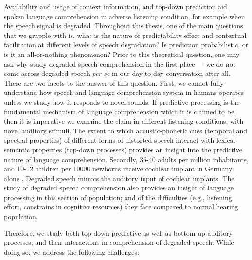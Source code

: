\documentclass[a4paper, nobind]{templates/ociamthesis}
\begin{document}
Availability and usage of context information, and top-down prediction aid spoken language comprehension in adverse listening condition, for example when the speech signal is degraded.
Throughout this thesis, one of the main questions that we grapple with is, what is the nature of predictability effect and contextual facilitation at different levels of speech degradation?
Is prediction probabilistic, or is it an all-or-nothing phenomenon?
Prior to this theoretical question, one may ask why study degraded speech comprehension in the first place --- we do not come across degraded speech \emph{per se} in our day-to-day conversation after all.
There are two facets to the answer of this question.
First, we cannot fully understand how speech and language comprehension system in humans operates unless we study how it responds to novel sounds.
If predictive processing is the fundamental mechanism of language comprehension which it is claimed to be, then it is imperative we examine the claim in different listening conditions, with novel auditory stimuli.
The extent to which acoustic-phonetic cues (temporal and spectral properties) of different forms of distorted speech interact with lexical-semantic properties (top-down processes) provides an insight into the predictive nature of language comprehension.
Secondly, 35-40 adults per million inhabitants, and 10-12 children per 10000 newborns receive cochlear implant in Germany alone \autocite{Deraeve2020}.
Degraded speech mimics the auditory input of cochlear implants.
The study of degraded speech comprehension also provides an insight of language processing in this section of population;
and of the difficulties (e.g., listening effort, constrains in cognitive resources) they face compared to normal hearing population.

Therefore, we study both top-down predictive as well as bottom-up auditory processes, and their interactions in comprehension of degraded speech.
While doing so, we address the following challenges:
\end{document}

